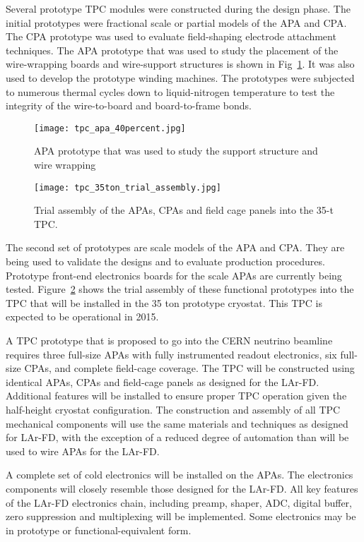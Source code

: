 Several prototype TPC modules were constructed during the design phase. The initial prototypes were fractional scale or partial models of the APA and CPA. The CPA prototype was used to evaluate field-shaping electrode attachment techniques. The APA prototype that was used to study the placement of the wire-wrapping boards and wire-support structures is shown in Fig~\ref{fig:tpc-apa-40percent}. It was also used to develop the prototype winding machines. The prototypes were subjected to numerous thermal cycles down to liquid-nitrogen temperature to test the integrity of the wire-to-board and board-to-frame bonds. 

\begin{figure}[htbp]
\centering
\texttt{[image: tpc\_apa\_40percent.jpg]}
\caption{APA prototype that was used to study the support structure and wire wrapping}
\label{fig:tpc-apa-40percent}
\end{figure}


\begin{figure}[htbp]
\centering
\texttt{[image: tpc\_35ton\_trial\_assembly.jpg]}
\caption{Trial assembly of the APAs, CPAs and field cage panels into the 35-t TPC.}
\label{fig:tpc-35ton-trial}
\end{figure}


The second set of prototypes are scale models of the APA and CPA. They are being used to validate the designs and to evaluate production procedures. Prototype front-end electronics boards for the scale APAs are currently being tested. Figure~\ref{fig:tpc-35ton-trial} shows the trial assembly of these functional prototypes into the TPC that will be installed in the 35 ton prototype cryostat. This TPC is expected to be operational in 2015.

A TPC prototype that is proposed to go into the CERN neutrino beamline requires three full-size APAs with fully instrumented readout electronics, six full-size CPAs, and complete field-cage coverage. The TPC will be constructed using identical APAs, CPAs and field-cage panels as designed for the LAr-FD. Additional features will be installed to ensure proper TPC operation given the half-height cryostat configuration. The construction and assembly of all TPC mechanical components will use the same materials and techniques as designed for LAr-FD, with the exception of a reduced degree of automation than will be used to wire APAs for the LAr-FD. 

A complete set of cold electronics will be installed on the APAs. The electronics components will closely resemble those designed for the LAr-FD. All key features of the LAr-FD electronics chain, including preamp, shaper, ADC, digital buffer, zero suppression and multiplexing will be implemented. Some electronics may be in prototype or functional-equivalent form.


